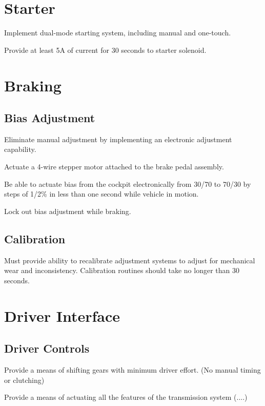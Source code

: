 \section{Starter}

Implement dual-mode starting system, including manual and one-touch.

Provide at least 5A of current for 30 seconds to starter solenoid.


\section{Braking}


\subsection{Bias Adjustment}

Eliminate manual adjustment by implementing an electronic adjustment
capability. 

Actuate a 4-wire stepper motor attached to the brake pedal assembly.

Be able to actuate bias from the cockpit electronically from 30/70
to 70/30 by steps of 1/2\% in less than one second while vehicle in
motion.

Lock out bias adjustment while braking.


\subsection{Calibration}

Must provide ability to recalibrate adjustment systems to adjust for
mechanical wear and inconsistency. Calibration routines should take
no longer than 30 seconds. 





\section{Driver Interface}


\subsection{Driver Controls}

Provide a means of shifting gears with minimum driver effort. (No
manual timing or clutching)

Provide a means of actuating all the features of the transmission
system (....)


